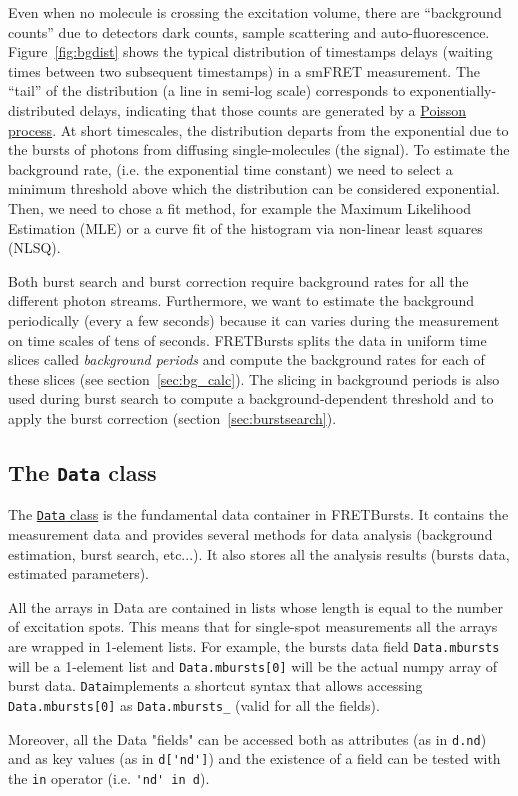 Even when no molecule is crossing the excitation volume, there are “background counts” due to detectors dark counts, sample scattering and auto-fluorescence. Figure~\ref{fig:bgdist} shows the typical distribution of timestamps delays (waiting times between two subsequent timestamps) in a smFRET measurement. The “tail” of the distribution (a line in semi-log scale) corresponds to exponentially-distributed delays, indicating that those counts are generated by a \href{http://en.wikipedia.org/wiki/Poisson_process}{Poisson process}. At short timescales, the distribution departs from the exponential due to the bursts of photons from diffusing single-molecules (the signal). To estimate the background rate, (i.e. the exponential time constant) we need to select a minimum threshold above which the distribution can be considered exponential. Then, we need to chose a fit method, for example the Maximum Likelihood Estimation (MLE) or a curve fit of the histogram via non-linear least squares (NLSQ).

Both burst search and burst correction require background rates for all the different photon streams. Furthermore, we want to estimate the background periodically (every a few seconds) because it can varies during the measurement on time scales of tens of seconds. FRETBursts splits the data in uniform time slices called \textit{background periods} and compute the background rates for each of these slices (see section~\ref{sec:bg_calc}). The slicing in background periods is also used during burst search to compute a background-dependent threshold and to apply the burst correction (section~\ref{sec:burstsearch}).

\subsection{The \texttt{Data} class}
\label{sec:data_intro}

The \href{http://fretbursts.readthedocs.org/en/latest/data_class.html}{\texttt{Data} class} is the fundamental data container in FRETBursts. It contains the measurement data and provides several methods for data analysis (background estimation, burst search, etc...). It also stores all the analysis results (bursts data, estimated parameters).

All the arrays in Data are contained in lists whose length is equal to the number of excitation spots. This means that for single-spot measurements all the arrays are wrapped in 1-element lists. For example, the bursts data field \verb|Data.mbursts| will be a 1-element list and \verb|Data.mbursts[0]| will be the actual numpy array of burst data. \verb|Data|implements a shortcut syntax that allows accessing 
\verb|Data.mbursts[0]| as \verb|Data.mbursts_| (valid for all the fields).

Moreover, all the Data "fields" can be accessed both as attributes (as in \verb|d.nd|) and as key values (as in \verb|d['nd']|) and the existence of a field can be tested with the \verb|in| operator (i.e. \verb|'nd' in d|).
